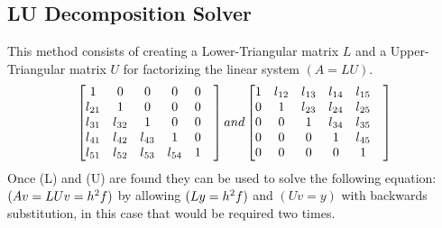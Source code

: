 \documentclass[12pt]{article}
\begin{document}
\subsection{LU Decomposition Solver}
This method consists of creating a Lower-Triangular matrix $L$ and a Upper-Triangular matrix $U$ for factorizing the linear system $(A = LU)$.\\
\pagebreak
\bigskip
\bigskip
\bigskip
$$
\begin{bmatrix}
	1& 0& 0& 0& 0&\\
	l\textsubscript{21}& 1&  0& 0& 0&\\
	l\textsubscript{31}& l\textsubscript{32}& 1&  0& 0&\\
	l\textsubscript{41}& l\textsubscript{42}& l\textsubscript{43}& 1& 0&\\
	l\textsubscript{51}& l\textsubscript{52}& l\textsubscript{53}& l\textsubscript{54}& 1&
\end{bmatrix}
and
\begin{bmatrix}
1& l\textsubscript{12}& l\textsubscript{13}& l\textsubscript{14}& l\textsubscript{15}&\\
0& 1& l\textsubscript{23}& l\textsubscript{24}& l\textsubscript{25}&\\
0& 0& 1& l\textsubscript{34}& l\textsubscript{35}&\\
0& 0& 0& 1& l\textsubscript{45}& \\
0& 0& 0& 0& 1&

\end{bmatrix}
$$
Once (L) and (U) are found they can be used to solve the following equation: $(Av = LUv = h\textsuperscript{2} f)$ by allowing $(Ly = h\textsuperscript{2}f)$ and $(Uv = y)$ with backwards substitution, in this case that would be required two times.
\end{document}
